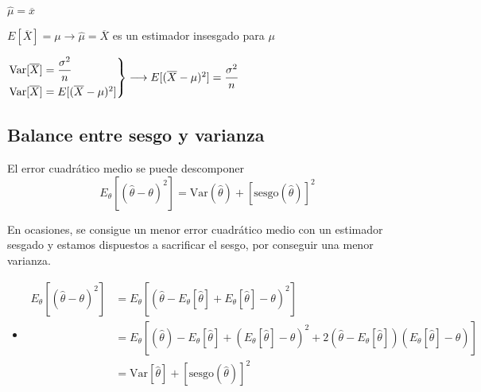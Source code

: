 $\hat{\mu}=\overline{x}$  

$E[\overline{X}]=\mu\longrightarrow \hat{\mu}=\overline{X}$ es un estimador insesgado para $\mu$

$\begin{rcases}
    \mathrm{Var}[\overline{X}]=\dfrac{\sigma^2}{n}\\
    \mathrm{Var}[\overline{X}]=E[(\overline{X}-\mu)^2]
\end{rcases}\longrightarrow E[(\overline{X}-\mu)^2]=\dfrac{\sigma^2}{n} $ 
\subsection{Balance entre sesgo y varianza}
\begin{tcolorbox}[colback=olive!5!white, colframe=olive!75!black, title=\textbf{Sesgo y varianza}]
El error cuadrático medio se puede descomponer \[
    E_\theta[(\hat{\theta}-\theta)^2]=\mathrm{Var}(\hat{\theta})+[\mathrm{sesgo}(\hat{\theta})]^2
\] 
\end{tcolorbox}
En ocasiones, se consigue un menor error cuadrático medio con un estimador sesgado y estamos dispuestos a sacrificar el sesgo, por conseguir una menor varianza.
\begin{itemize}[label=\color{red}\textbullet, leftmargin=*]
    \item {}
        \[
        \begin{aligned}
            E_\theta[(\hat{\theta}-\theta)^2]&= E_\theta[(\hat{\theta}-E_\theta[\hat{\theta}]+E_\theta[\hat{\theta}]-\theta)^2] \\
                                             &= E_\theta[(\hat{\theta})-E_\theta[\hat{\theta}]+(E_\theta[\hat{\theta}]-\theta)^2+2(\hat{\theta}-E_\theta[\hat{\theta}])(E_\theta[\hat{\theta}]-\theta)] \\
                                             &= \mathrm{Var}[\hat{\theta}]+[\mathrm{sesgo}(\hat{\theta})]^2 \\
        \end{aligned}
        \] 
\end{itemize}
